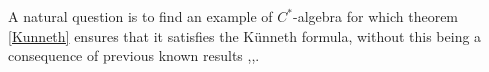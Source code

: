 A natural question is to find an example of $C^*$-algebra for which theorem \ref{Kunneth} ensures that it satisfies the Künneth formula, without this being a consequence of previous known results \cite{RosenbergKunneth},\cite{ChabertEOY},\cite{OY4}.




























